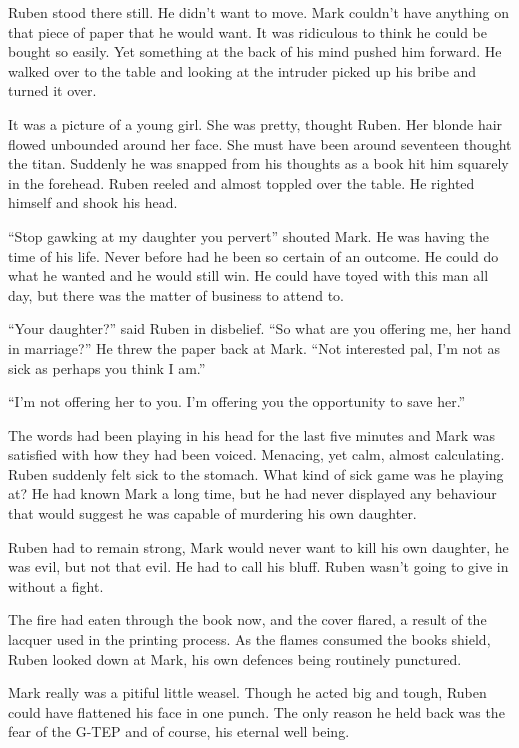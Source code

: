 Ruben stood there still.  He didn't want to move.  Mark couldn't have anything on that piece of paper that he would want.  It was ridiculous to think he could be bought so easily.  Yet something at the back of his mind pushed him forward.  He walked over to the table and looking at the intruder picked up his bribe and turned it over.  

It was a picture of a young girl.  She was pretty, thought Ruben.  Her blonde hair flowed unbounded around her face.  She must have been around seventeen thought the titan.  Suddenly he was snapped from his thoughts as a book hit him squarely in the forehead.  Ruben reeled and almost toppled over the table.  He righted himself and shook his head.

``Stop gawking at my daughter you pervert'' shouted Mark.  He was having the time of his life.  Never before had he been so certain of an outcome.  He could do what he wanted and he would still win.  He could have toyed with this man all day, but there was the matter of business to attend to.

``Your daughter?'' said Ruben in disbelief.  ``So what are you offering me, her hand in marriage?''  He threw the paper back at Mark.  ``Not interested pal, I'm not as sick as perhaps you think I am.''

``I'm not offering her to you.  I'm offering you the opportunity to save her.''

The words had been playing in his head for the last five minutes and Mark was satisfied with how they had been voiced.  Menacing, yet calm, almost calculating.  Ruben suddenly felt sick to the stomach.  What kind of sick game was he playing at?  He had known Mark a long time, but he had never displayed any behaviour that would suggest he was capable of murdering his own daughter.

Ruben had to remain strong, Mark would never want to kill his own daughter, he was evil, but not that evil.  He had to call his bluff.  Ruben wasn't going to give in without a fight.  

The fire had eaten through the book now, and the cover flared, a result of the lacquer used in the printing process.  As the flames consumed the books shield, Ruben looked down at Mark, his own defences being routinely punctured.  

Mark really was a pitiful little weasel.  Though he acted big and tough, Ruben could have flattened his face in one punch.  The only reason he held back was the fear of the G-TEP and of course, his eternal well being.

